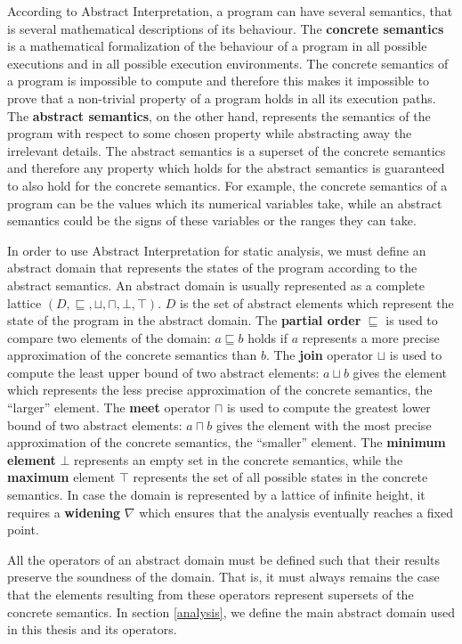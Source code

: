 \documentclass[10pt]{report}
\begin{document}
According to Abstract Interpretation, a program can have several semantics, that is several mathematical descriptions of its behaviour. The \textbf{concrete semantics} is a mathematical formalization of the behaviour of a program in all possible executions and in all possible execution environments. The concrete semantics of a program is impossible to compute and therefore this makes it impossible to prove that a non-trivial property of a program holds in all its execution paths. The \textbf{abstract semantics}, on the other hand, represents the semantics of the program with respect to some chosen property while abstracting away the irrelevant details. The abstract semantics is a superset of the concrete semantics and therefore any property which holds for the abstract semantics is guaranteed to also hold for the concrete semantics. For example, the concrete semantics of a program can be the values which its numerical variables take, while an abstract semantics could be the signs of these variables or the ranges they can take.   

In order to use Abstract Interpretation for static analysis, we must define an abstract domain that represents the states of the program according to the abstract semantics. An abstract domain is usually represented as a complete lattice $ (D, \sqsubseteq, \sqcup, \sqcap, \bot, \top) $. $ D $ is the set of abstract elements which represent the state of the program in the abstract domain. The \textbf{partial order} $ \sqsubseteq $ is used to compare two elements of the domain: $ a \sqsubseteq b$ holds if $ a $ represents a more precise approximation of the concrete semantics than $ b $. The \textbf{join} operator $ \sqcup $ is used to compute the least upper bound of two abstract elements: $ a \sqcup b$ gives the element which represents the less precise approximation of the concrete semantics, the ``larger'' element. The \textbf{meet} operator $ \sqcap $ is used to compute the greatest lower bound of two abstract elements: $ a \sqcap b $ gives the element with the most precise approximation of the concrete semantics, the ``smaller'' element. The \textbf{minimum element} $ \bot $ represents an empty set in the concrete semantics, while the \textbf{maximum} element $ \top $ represents the set of all possible states in the concrete semantics. In case the domain is represented by a lattice of infinite height, it requires a \textbf{widening} $ \nabla $ which ensures that the analysis eventually reaches a fixed point.  

All the operators of an abstract domain must be defined such that their results preserve the soundness of the domain. That is, it must always remains the case that the elements resulting from these operators represent supersets of the concrete semantics. In section \ref{analysis}, we define the main abstract domain used in this thesis and its operators. 
\end{document}
